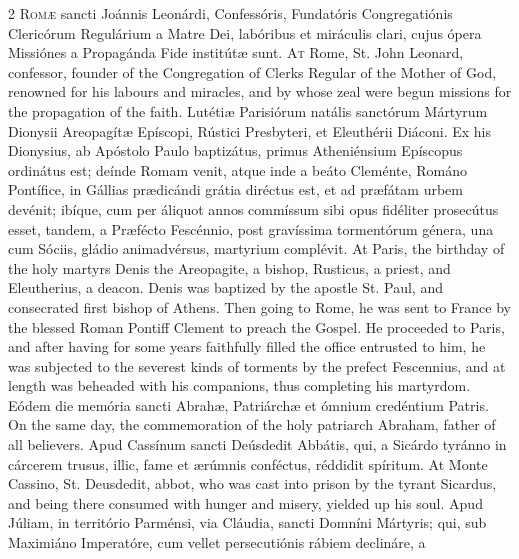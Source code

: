 \begin{paracol}{2}
\lettrine[lines=2]{R}{omæ} sancti Joánnis 
 Leonárdi, Confessóris, Fundatóris Congregatiónis Clericórum Regulárium a 
 Matre Dei, labóribus et miráculis clari, cujus ópera Missiónes a Propagánda 
 Fide institútæ sunt.
\switchcolumn
{}
\lettrine[lines=2]{A}{t} Rome, St. John Leonard, 
 confessor, founder of the Congregation of Clerks Regular of the Mother of 
 God, renowned for his labours and miracles, and by whose zeal were begun 
 missions for the propagation of the faith.
\switchcolumn*
{}
Lutétiæ Parisiórum 
 natális sanctórum Mártyrum Dionysii Areopagítæ Epíscopi, Rústici Presbyteri, 
 et Eleuthérii Diáconi. Ex his Dionysius, ab Apóstolo Paulo baptizátus, 
 primus Atheniénsium Epíscopus ordinátus est; deínde Romam venit, atque inde 
 a beáto Cleménte, Románo Pontífice, in Gállias prædicándi grátia diréctus 
 est, et ad præfátam urbem devénit; ibíque, cum per áliquot annos commíssum 
 sibi opus fidéliter prosecútus esset, tandem, a Præfécto Fescénnio, post 
 gravíssima tormentórum génera, una cum Sóciis, gládio animadvérsus, 
 martyrium complévit.
\switchcolumn
{}
At Paris, the birthday of the holy 
 martyrs Denis the Areopagite, a bishop, Rusticus, a priest, and Eleutherius, 
 a deacon. Denis was baptized by the apostle St. Paul, and consecrated 
 first bishop of Athens. Then going to Rome, he was sent to France by 
 the blessed Roman Pontiff Clement to preach the Gospel. He proceeded 
 to Paris, and after having for some years faithfully filled the office 
 entrusted to him, he was subjected to the severest kinds of torments by the 
 prefect Fescennius, and at length was beheaded with his companions, thus 
 completing his martyrdom.
\switchcolumn*
{}
Eódem die memória 
 sancti Abrahæ, Patriárchæ et ómnium credéntium Patris.
\switchcolumn
{}
On the same day, the commemoration 
 of the holy patriarch Abraham, father of all believers.
\switchcolumn*
{}
Apud Cassínum sancti 
 Deúsdedit Abbátis, qui, a Sicárdo tyránno in cárcerem trusus, illic, 
 fame et ærúmnis conféctus, réddidit spíritum.
\switchcolumn
{}
At Monte Cassino, St. Deusdedit, 
 abbot, who was cast into prison by the tyrant Sicardus, and being there 
 consumed with hunger and misery, yielded up his soul.
\switchcolumn*
{}
Apud Júliam, in 
 território Parménsi, via Cláudia, sancti Domníni Mártyris; qui, sub 
 Maximiáno Imperatóre, cum vellet persecutiónis rábiem declináre, a 

\end{paracol}
